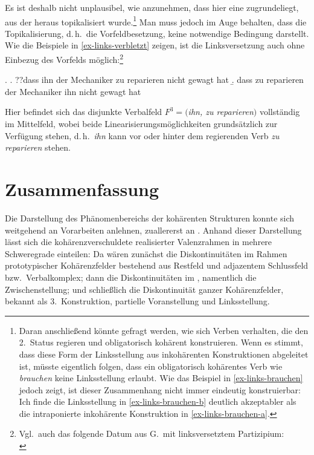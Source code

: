 Es ist deshalb nicht unplausibel, wie \citet[238]{Meurers:99} anzunehmen, dass hier eine  zugrundeliegt, aus der heraus topikalisiert wurde.\footnote{Daran anschlie\ss end könnte gefragt werden, wie sich Verben verhalten, die den 2.~Status regieren und obligatorisch kohärent konstruieren. Wenn es stimmt, dass diese Form der Linksstellung aus inkohärenten Konstruktionen abgeleitet ist, müsste eigentlich folgen, dass ein obligatorisch kohärentes Verb wie {\it brauchen} keine Linksstellung erlaubt. Wie das Beispiel in \ref{ex-links-brauchen} jedoch zeigt, ist dieser Zusammenhang nicht immer eindeutig konstruierbar:\\ 
Ich finde die Linksstellung in \ref{ex-links-brauchen-b} deutlich akzeptabler als die intraponierte inkohärente Konstruktion in \ref{ex-links-brauchen-a}.} Man muss jedoch im Auge behalten, dass die Topikalisierung, d.\,h.\ die Vorfeldbesetzung, keine notwendige Bedingung darstellt. Wie die Beispiele in \ref{ex-links-verbletzt} zeigen, ist die Linksversetzung auch ohne Einbezug des Vorfelds möglich:\footnote{Vgl.\ auch das folgende Datum aus G.\,\cite{GMueller:98} mit linksversetztem Partizipium:\\ 
}     

\ex. \label{ex-links-verbletzt}
\a. ??dass ihn der Mechaniker zu reparieren nicht gewagt hat \label{ex-links-verbletzt-a}
\b. dass zu reparieren der Mechaniker ihn nicht gewagt hat \label{ex-links-verbletzt-b}

Hier befindet sich das disjunkte Verbalfeld $F^3 = (${\it ihn, zu reparieren}$)$ vollständig im Mittelfeld, wobei beide Linearisierungsmöglichkeiten grundsätzlich zur Verfügung stehen, d.\,h.\ {\it ihn} kann vor oder hinter dem regierenden Verb {\it zu reparieren}  stehen.


\section{Zusammenfassung}

Die Darstellung des Phänomenbereichs der kohärenten Strukturen konnte sich weitgehend an Vorarbeiten anlehnen, zuallererst an \cite{Bech:55}. Anhand dieser Darstellung lässt sich die kohärenzverschuldete  realisierter Valenzrahmen in mehrere Schweregrade einteilen: Da wären zunächst die Diskontinuitäten im Rahmen prototypischer Kohärenzfelder bestehend aus Restfeld und adjazentem Schlussfeld bzw.\ Verbalkomplex; dann die Diskontinuitäten im , namentlich die Zwischenstellung; und schlie\ss lich die Diskontinuität ganzer Kohärenzfelder, bekannt als 3.~Konstruktion, partielle Voranstellung und Linksstellung.  


